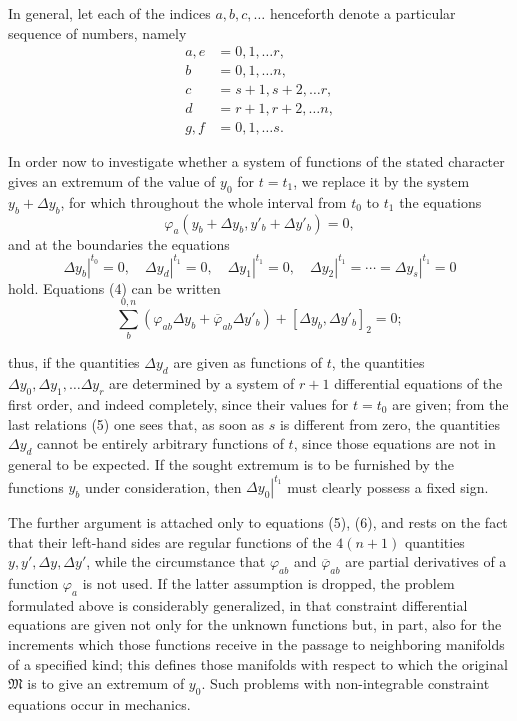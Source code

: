 \documentclass[11pt,a4paper,leqno]{article}
\begin{document}
In general, let each of the indices $a,b,c,\ldots$ henceforth denote a
particular sequence of numbers, namely
\[
\begin{aligned}
a,e&=0,1,\ldots r,\\
b&=0,1,\ldots n,\\
c&=s+1,s+2,\ldots r,\\
d&=r+1,r+2,\ldots n,\\
g,f&=0,1,\ldots s.
\end{aligned}
\]

In order now to investigate whether a system of functions of the stated
character gives an extremum of the value of $y_0$ for $t=t_1$, we replace
it by the system $y_b+\Delta y_b$, for which throughout the whole interval
from $t_0$ to $t_1$ the equations
\begin{equation}\tag{4}
\varphi_a(y_b+\Delta y_b,y'_b+\Delta y'_b)=0,
\end{equation}
and at the boundaries the equations
\begin{equation}\tag{5}
\left.\Delta y_b\right|^{t_0}=0,\quad
\left.\Delta y_d\right|^{t_1}=0,\quad
\left.\Delta y_1\right|^{t_1}=0,\quad
\left.\Delta y_2\right|^{t_1}=\cdots=
\left.\Delta y_s\right|^{t_1}=0
\end{equation}
hold. Equations (4) can be written
\begin{equation}\tag{6}
\sum_b^{0,n}\left(\varphi_{ab}\Delta y_b+
\overline{\varphi}_{ab}\Delta y'_b\right)
+[\Delta y_b,\Delta y'_b]_2=0;
\end{equation}

thus, if the quantities $\Delta y_d$ are given as functions of $t$, the
quantities $\Delta y_0,\Delta y_1,\ldots\Delta y_r$ are determined by a
system of $r+1$ differential equations of the first order, and indeed
completely, since their values for $t=t_0$ are given; from the last
relations (5) one sees that, as soon as $s$ is different from zero, the
quantities $\Delta y_d$ cannot be entirely arbitrary functions of $t$,
since those equations are not in general to be expected. If the sought
extremum is to be furnished by the functions $y_b$ under consideration,
then $\left.\Delta y_0\right|^{t_1}$ must clearly possess a fixed sign.

The further argument is attached only to equations (5), (6), and rests on
the fact that their left-hand sides are regular functions of the $4(n+1)$
quantities $y,y',\Delta y,\Delta y'$, while the circumstance that
$\varphi_{ab}$ and $\overline{\varphi}_{ab}$ are partial derivatives of a
function $\varphi_a$ is not used. If the latter assumption is dropped, the
problem formulated above is considerably generalized, in that constraint
differential equations are given not only for the unknown functions but,
in part, also for the increments which those functions receive in the
passage to neighboring manifolds of a specified kind; this defines those
manifolds with respect to which the original $\mathfrak M$ is to give an
extremum of $y_0$. Such problems with non-integrable constraint equations
occur in mechanics.
\end{document}
